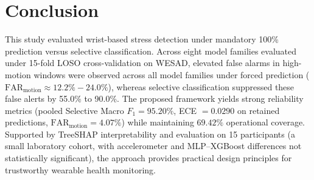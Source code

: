 \documentclass[conference]{IEEEtran}
\begin{document}
\section{Conclusion}
This study evaluated wrist-based stress detection under mandatory 100\% prediction versus selective classification. Across eight model families evaluated under 15-fold LOSO cross-validation on WESAD, elevated false alarms in high-motion windows were observed across all model families under forced prediction ($\text{FAR}_{\text{motion}} \approx 12.2\% - 24.0\%$), whereas selective classification suppressed these false alerts by 55.0\% to 90.0\%. The proposed framework yields strong reliability metrics (pooled Selective Macro $F_1 = 95.20\%$, ECE $= 0.0290$ on retained predictions, $\text{FAR}_{\text{motion}} = 4.07\%$) while maintaining $69.42\%$ operational coverage. Supported by TreeSHAP interpretability and evaluation on 15 participants (a small laboratory cohort, with accelerometer and MLP--XGBoost differences not statistically significant), the approach provides practical design principles for trustworthy wearable health monitoring.
\end{document}

